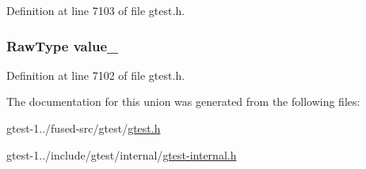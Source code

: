 \-Definition at line 7103 of file gtest.\-h.

\hypertarget{uniontesting_1_1internal_1_1FloatingPoint_1_1FloatingPointUnion_a4c63184d103d6c4952511640f80e90a3}{
\subsubsection[{value\-\_\-}]{\setlength{\rightskip}{0pt plus 5cm}\-Raw\-Type {\bf value\-\_\-}}}\label{d6/dd2/uniontesting_1_1internal_1_1FloatingPoint_1_1FloatingPointUnion_a4c63184d103d6c4952511640f80e90a3}


\-Definition at line 7102 of file gtest.\-h.



\-The documentation for this union was generated from the following files\-:\begin{DoxyCompactItemize}
\item 
gtest-\/1../fused-\/src/gtest/\hyperlink{fused-src_2gtest_2gtest_8h}{gtest.\-h}\item 
gtest-\/1../include/gtest/internal/\hyperlink{gtest-internal_8h}{gtest-\/internal.\-h}\end{DoxyCompactItemize}
